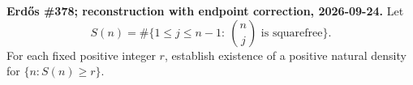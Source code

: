 \textbf{Erd\H{o}s \#378; reconstruction with endpoint correction, 2026-09-24.}
Let
\[
S(n)=\#\{1\leq j\leq n-1:\ \binom nj\text{ is squarefree}\}.
\]
For each fixed positive integer $r$, establish existence of a positive natural density for $\{n:S(n)\geq r\}$.
